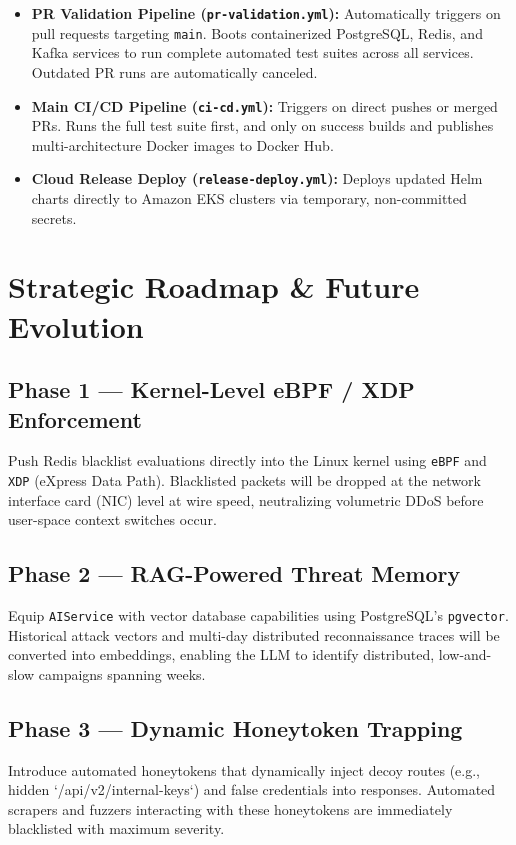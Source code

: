 \documentclass[12pt, a4paper]{article}
\newcommand{\tech}[1]{\texttt{\color{accentblue}#1}}
\newcommand{\service}[1]{\texttt{\color{accentteal}#1}}
\begin{document}
\begin{itemize}[leftmargin=*, itemsep=4pt]
    \item \textbf{PR Validation Pipeline (\texttt{pr-validation.yml}):} Automatically triggers on pull requests targeting \texttt{main}. Boots containerized PostgreSQL, Redis, and Kafka services to run complete automated test suites across all services. Outdated PR runs are automatically canceled.
    \item \textbf{Main CI/CD Pipeline (\texttt{ci-cd.yml}):} Triggers on direct pushes or merged PRs. Runs the full test suite first, and only on success builds and publishes multi-architecture Docker images to Docker Hub.
    \item \textbf{Cloud Release Deploy (\texttt{release-deploy.yml}):} Deploys updated Helm charts directly to Amazon EKS clusters via temporary, non-committed secrets.
\end{itemize}

\newpage
\section{Strategic Roadmap \& Future Evolution}

\subsection{Phase 1 — Kernel-Level eBPF / XDP Enforcement}
Push Redis blacklist evaluations directly into the Linux kernel using \tech{eBPF} and \tech{XDP} (eXpress Data Path). Blacklisted packets will be dropped at the network interface card (NIC) level at wire speed, neutralizing volumetric DDoS before user-space context switches occur.

\subsection{Phase 2 — RAG-Powered Threat Memory}
Equip \service{AIService} with vector database capabilities using PostgreSQL's \tech{pgvector}. Historical attack vectors and multi-day distributed reconnaissance traces will be converted into embeddings, enabling the LLM to identify distributed, low-and-slow campaigns spanning weeks.

\subsection{Phase 3 — Dynamic Honeytoken Trapping}
Introduce automated honeytokens that dynamically inject decoy routes (e.g., hidden `/api/v2/internal-keys`) and false credentials into responses. Automated scrapers and fuzzers interacting with these honeytokens are immediately blacklisted with maximum severity.
\end{document}
